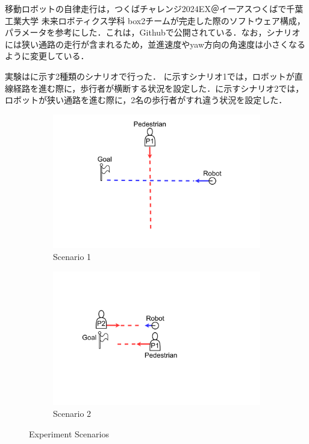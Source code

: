 移動ロボットの自律走行は，つくばチャレンジ2024EX＠イーアスつくば\cite{つくばチャレンジ36:online}で千葉工業大学 未来ロボティクス学科 box2チームが完走した際のソフトウェア構成，パラメータを参考にした．これは，Githubで公開されている\cite{openrdco85:online}．なお，シナリオには狭い通路の走行が含まれるため，並進速度やyaw方向の角速度は小さくなるように変更している．

\newpage

実験はに示す2種類のシナリオで行った．
に示すシナリオ1では，ロボットが直線経路を進む際に，歩行者が横断する状況を設定した．に示すシナリオ2では，ロボットが狭い通路を進む際に，2名の歩行者がすれ違う状況を設定した．

\begin{figure}[H]
  \centering
  \begin{subfigure}{0.80\textwidth}
    \centering
    \includegraphics[keepaspectratio, scale=0.15]{images/scenario1.pdf}
    \caption{Scenario 1}
    \label{Fig:scenario1}
  \end{subfigure}
  \vspace{10pt}
  \begin{subfigure}{0.80\textwidth}
    \centering
    \includegraphics[keepaspectratio, scale=0.15]{images/scenario2.pdf}
    \caption{Scenario 2}
    \label{Fig:scenario2}
  \end{subfigure}
  \caption{Experiment Scenarios}
  \label{Fig:experiment-scenarios}
\end{figure}

